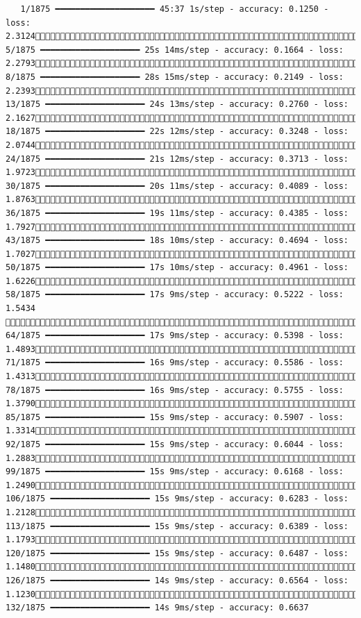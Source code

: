 \documentclass[
  letterpaper,
  DIV=11,
  numbers=noendperiod]{scrreprt}
\begin{document}
\begin{verbatim}
   1/1875 ━━━━━━━━━━━━━━━━━━━━ 45:37 1s/step - accuracy: 0.1250 - loss: 2.3124   5/1875 ━━━━━━━━━━━━━━━━━━━━ 25s 14ms/step - accuracy: 0.1664 - loss: 2.2793   8/1875 ━━━━━━━━━━━━━━━━━━━━ 28s 15ms/step - accuracy: 0.2149 - loss: 2.2393  13/1875 ━━━━━━━━━━━━━━━━━━━━ 24s 13ms/step - accuracy: 0.2760 - loss: 2.1627  18/1875 ━━━━━━━━━━━━━━━━━━━━ 22s 12ms/step - accuracy: 0.3248 - loss: 2.0744  24/1875 ━━━━━━━━━━━━━━━━━━━━ 21s 12ms/step - accuracy: 0.3713 - loss: 1.9723  30/1875 ━━━━━━━━━━━━━━━━━━━━ 20s 11ms/step - accuracy: 0.4089 - loss: 1.8763  36/1875 ━━━━━━━━━━━━━━━━━━━━ 19s 11ms/step - accuracy: 0.4385 - loss: 1.7927  43/1875 ━━━━━━━━━━━━━━━━━━━━ 18s 10ms/step - accuracy: 0.4694 - loss: 1.7027  50/1875 ━━━━━━━━━━━━━━━━━━━━ 17s 10ms/step - accuracy: 0.4961 - loss: 1.6226  58/1875 ━━━━━━━━━━━━━━━━━━━━ 17s 9ms/step - accuracy: 0.5222 - loss: 1.5434   64/1875 ━━━━━━━━━━━━━━━━━━━━ 17s 9ms/step - accuracy: 0.5398 - loss: 1.4893  71/1875 ━━━━━━━━━━━━━━━━━━━━ 16s 9ms/step - accuracy: 0.5586 - loss: 1.4313  78/1875 ━━━━━━━━━━━━━━━━━━━━ 16s 9ms/step - accuracy: 0.5755 - loss: 1.3790  85/1875 ━━━━━━━━━━━━━━━━━━━━ 15s 9ms/step - accuracy: 0.5907 - loss: 1.3314  92/1875 ━━━━━━━━━━━━━━━━━━━━ 15s 9ms/step - accuracy: 0.6044 - loss: 1.2883  99/1875 ━━━━━━━━━━━━━━━━━━━━ 15s 9ms/step - accuracy: 0.6168 - loss: 1.2490 106/1875 ━━━━━━━━━━━━━━━━━━━━ 15s 9ms/step - accuracy: 0.6283 - loss: 1.2128 113/1875 ━━━━━━━━━━━━━━━━━━━━ 15s 9ms/step - accuracy: 0.6389 - loss: 1.1793 120/1875 ━━━━━━━━━━━━━━━━━━━━ 15s 9ms/step - accuracy: 0.6487 - loss: 1.1480 126/1875 ━━━━━━━━━━━━━━━━━━━━ 14s 9ms/step - accuracy: 0.6564 - loss: 1.1230 132/1875 ━━━━━━━━━━━━━━━━━━━━ 14s 9ms/step - accuracy: 0.6637 
\end{verbatim}
\end{document}

